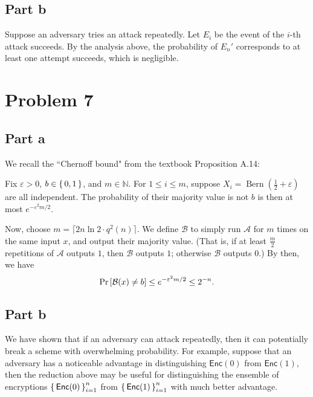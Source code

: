 \documentclass{article}
\DeclareMathOperator{\Bern}{Bern}
\begin{document}
\subsection*{Part b}

Suppose an adversary tries an attack repeatedly.
Let $E_i$ be the event of the $i$-th attack succeeds.
By the analysis above, the probability of $E_n'$ corresponds to at least one attempt succeeds, which is negligible.

\section*{Problem 7}

\subsection*{Part a}

We recall the ``Chernoff bound" from the textbook Proposition A.14:
\begin{theorem}
    \label{thm:chernoff}
    Fix $\varepsilon>0$, $b\in\set{0, 1}$, and $m\in\mathbb{N}$.
    For $1\leq i\leq m$, suppose $X_i=\Bern(\frac{1}{2}+\varepsilon)$ are all independent.
    The probability of their majority value is not $b$ is then at most $e^{-\varepsilon^2m/2}$.
\end{theorem}

Now, choose $m=\lceil 2n\ln 2\cdot q^2(n) \rceil$.
We define $\mathcal{B}$ to simply run $\mathcal{A}$ for $m$ times on the same input $x$, and output their majority value.
(That is, if at least $\frac{m}{2}$ repetitions of $\mathcal{A}$ outputs $1$, then $\mathcal{B}$ outputs $1$;
otherwise $\mathcal{B}$ outputs $0$.)
By  then, we have
$$\Pr\left[\mathcal{B}(x)\ne b\right]\leq e^{-\varepsilon^2m/2}\leq 2^{-n}.$$

\subsection*{Part b}

We have shown that if an adversary can attack repeatedly, then it can potentially break a scheme with overwhelming probability.
For example, suppose that an adversary has a noticeable advantage in distinguishing $\mathsf{Enc}(0)$ from $\mathsf{Enc}(1)$,
then the reduction above may be useful for distinguishing the ensemble of encryptions $\set{\mathsf{Enc}(0)}_{i=1}^n$ from $\set{\mathsf{Enc}(1)}_{i=1}^n$ with much better advantage.
\end{document}
